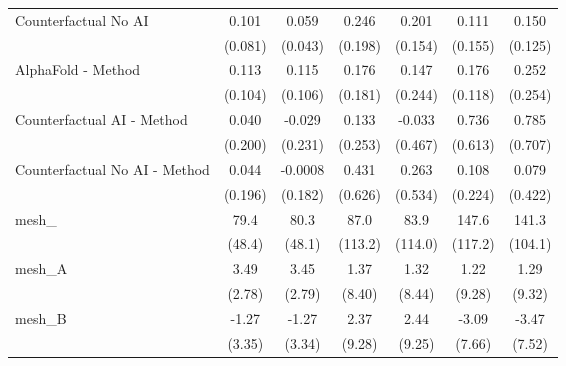 \begin{tabular}{lcccccc}
   Counterfactual No AI                                        & 0.101        & 0.059         & 0.246         & 0.201          & 0.111          & 0.150\\   
                                                               & (0.081)      & (0.043)       & (0.198)       & (0.154)        & (0.155)        & (0.125)\\   
   AlphaFold - Method                                          & 0.113        & 0.115         & 0.176         & 0.147          & 0.176          & 0.252\\   
                                                               & (0.104)      & (0.106)       & (0.181)       & (0.244)        & (0.118)        & (0.254)\\   
   Counterfactual AI - Method                                  & 0.040        & -0.029        & 0.133         & -0.033         & 0.736          & 0.785\\   
                                                               & (0.200)      & (0.231)       & (0.253)       & (0.467)        & (0.613)        & (0.707)\\   
   Counterfactual No AI - Method                               & 0.044        & -0.0008       & 0.431         & 0.263          & 0.108          & 0.079\\   
                                                               & (0.196)      & (0.182)       & (0.626)       & (0.534)        & (0.224)        & (0.422)\\   
   mesh\_                                                      & 79.4         & 80.3          & 87.0          & 83.9           & 147.6          & 141.3\\   
                                                               & (48.4)       & (48.1)        & (113.2)       & (114.0)        & (117.2)        & (104.1)\\   
   mesh\_A                                                     & 3.49         & 3.45          & 1.37          & 1.32           & 1.22           & 1.29\\   
                                                               & (2.78)       & (2.79)        & (8.40)        & (8.44)         & (9.28)         & (9.32)\\   
   mesh\_B                                                     & -1.27        & -1.27         & 2.37          & 2.44           & -3.09          & -3.47\\   
                                                               & (3.35)       & (3.34)        & (9.28)        & (9.25)         & (7.66)         & (7.52)\\   

\end{tabular}
